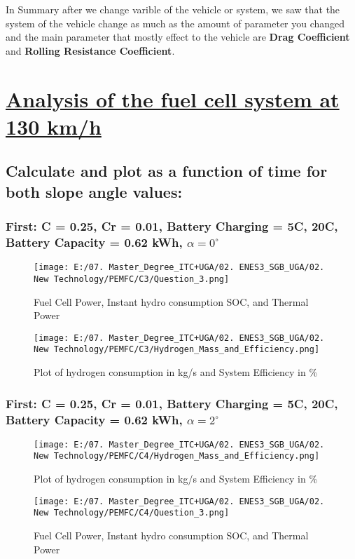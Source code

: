 \documentclass[12pt,a4paper]{article}
\numberwithin{equation}{section}
\begin{document}
In Summary after we change varible of the vehicle or system, we saw that the system of the vehicle change as much as the amount of parameter you changed and the main parameter that mostly effect to the vehicle are \textbf{Drag Coefficient} and \textbf{Rolling Resistance Coefficient}.

\section{\underline{Analysis of the fuel cell system at 130 km/h}}
\subsection{Calculate and plot as a function of time for both slope angle values:}


\subsubsection{First: C = 0.25, Cr = 0.01, Battery Charging = 5C, 20C, Battery Capacity = 0.62 kWh, $\alpha = 0^{\circ}$}

\begin{figure}[htbp]
	\centering 
	\texttt{[image: E:/07. Master\_Degree\_ITC+UGA/02. ENES3\_SGB\_UGA/02. New Technology/PEMFC/C3/Question\_3.png]}
	\caption{\small {Fuel Cell Power, Instant hydro consumption SOC, and Thermal Power}}
	\label{25}
\end{figure}
\begin{figure}[htbp]
	\centering 
	\texttt{[image: E:/07. Master\_Degree\_ITC+UGA/02. ENES3\_SGB\_UGA/02. New Technology/PEMFC/C3/Hydrogen\_Mass\_and\_Efficiency.png]}
	\caption{\small {Plot of hydrogen consumption in kg/s and System Efficiency in \%}}
	\label{26}
\end{figure}

\subsubsection{First: C = 0.25, Cr = 0.01, Battery Charging = 5C, 20C, Battery Capacity = 0.62 kWh, $\alpha = 2^{\circ}$}
\begin{figure}[htbp]
	\centering 
	\texttt{[image: E:/07. Master\_Degree\_ITC+UGA/02. ENES3\_SGB\_UGA/02. New Technology/PEMFC/C4/Hydrogen\_Mass\_and\_Efficiency.png]}
	\caption{\small {Plot of hydrogen consumption in kg/s and System Efficiency in \%}}
	\label{28}
\end{figure}
\newpage
\begin{figure}[htbp]
	\centering 
	\texttt{[image: E:/07. Master\_Degree\_ITC+UGA/02. ENES3\_SGB\_UGA/02. New Technology/PEMFC/C4/Question\_3.png]}
	\caption{\small {Fuel Cell Power, Instant hydro consumption SOC, and Thermal Power}}
	\label{27}
\end{figure}
\end{document}

